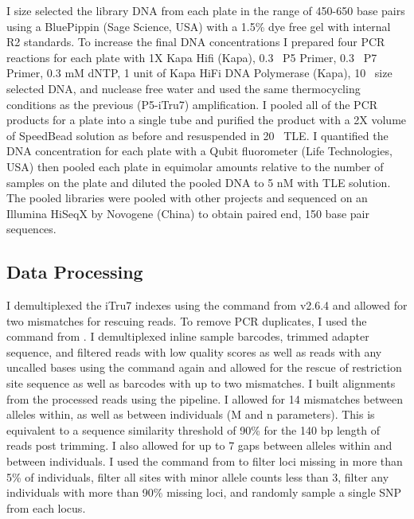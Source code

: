 I size selected the library DNA from each plate in the range of 450-650 base pairs using
a BluePippin (Sage Science, USA) with a 1.5\% dye free gel with internal R2 standards. 
To increase the final DNA concentrations I prepared four PCR reactions for each 
plate with 1X Kapa Hifi (Kapa), 0.3 \uM\ P5 Primer, 0.3 \uM\ P7 Primer, 0.3 mM dNTP, 
1 unit of Kapa HiFi DNA Polymerase (Kapa), 10 \uL\ size selected DNA, and 
nuclease free water and used the same thermocycling conditions as the previous
(P5-iTru7) amplification.
I pooled all of the PCR products for a plate into a single tube and purified 
the product with a 2X volume of SpeedBead solution as before and resuspended in 20 \uL\ TLE. 
I quantified the DNA concentration for each plate with a Qubit fluorometer 
(Life Technologies, USA) then pooled each plate in equimolar amounts relative 
to the number of samples on the plate and diluted the pooled DNA to 5 nM with
TLE solution. 
The pooled libraries were pooled with other projects and sequenced on an Illumina 
HiSeqX by Novogene (China) to obtain paired end, 150 base pair sequences. 

\subsection{Data Processing}
I demultiplexed the iTru7 indexes using the \processradtags command from 
\stacks v2.6.4 \parencites{rochette2019} and allowed for two mismatches for rescuing reads.
To remove PCR duplicates, I used the \clonefilter command from \stacks.
I demultiplexed inline sample barcodes, trimmed adapter sequence, and filtered 
reads with low quality scores as well as reads with any uncalled bases using the  
\processradtags command again and allowed for the rescue of restriction site sequence 
as well as barcodes with up to two mismatches.  
I built alignments from the processed reads using the \stacks pipeline. 
I allowed for 14 mismatches between alleles within, as well as between individuals
(M and n parameters). This is equivalent to a sequence similarity threshold of   
90\% for the 140 bp length of reads post trimming. 
I also allowed for up to 7 gaps between alleles within and between individuals.
I used the \populations command from \stacks to filter loci missing in more than   
5\% of individuals, filter all sites with minor allele counts less than 3, filter 
any individuals with more than 90\% missing loci, and randomly sample a single
SNP from each locus.


